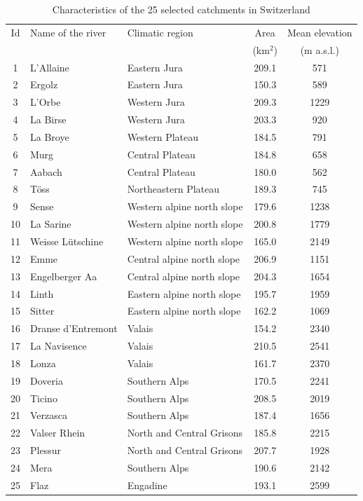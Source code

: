 \documentclass[draft]{agujournal2019}
\begin{document}
\begin{table}[hbt]
	\centering
	\caption{Characteristics of the 25 selected catchments in Switzerland}
	\small
	\begin{tabular}{cllcc}
		\hline 
		Id & Name of the river & Climatic region & Area & Mean elevation \\
		& & & (km$^2$) & (m a.s.l.) \\
		\hline 
		1 & L'Allaine & Eastern Jura & 209.1 & 571 \\
		2 & Ergolz & Eastern Jura & 150.3 & 589 \\
		3 & L'Orbe & Western Jura & 209.3 & 1229 \\
		4 & La Birse & Western Jura & 203.3 & 920 \\
		5 & La Broye & Western Plateau & 184.5 & 791 \\
		6 & Murg & Central Plateau & 184.8 & 658 \\
		7 & Aabach & Central Plateau & 180.0 & 562 \\
		8 & T\"oss & Northeastern Plateau & 189.3 & 745 \\
		9 & Sense & Western alpine north slope & 179.6 & 1238 \\
		10 & La Sarine & Western alpine north slope & 200.8 & 1779 \\
		11 & Weisse L\"utschine & Western alpine north slope & 165.0 & 2149 \\
		12 & Emme & Central alpine north slope & 206.9 & 1151 \\
		13 & Engelberger Aa & Central alpine north slope & 204.3 & 1654 \\
		14 & Linth & Eastern alpine north slope & 195.7 & 1959 \\
		15 & Sitter & Eastern alpine north slope & 162.2 & 1069 \\
		16 & Dranse d'Entremont & Valais & 154.2 & 2340 \\
		17 & La Navisence & Valais & 210.5 & 2541 \\
		18 & Lonza & Valais & 161.7 & 2370 \\
		19 & Doveria & Southern Alps & 170.5 & 2241 \\
		20 & Ticino & Southern Alps & 208.5 & 2019 \\
		21 & Verzasca & Southern Alps & 187.4 & 1656 \\
		22 & Valser Rhein & North and Central Grisons & 185.8 & 2215 \\
		23 & Plessur & North and Central Grisons & 207.7 & 1928 \\
		24 & Mera & Southern Alps & 190.6 & 2142 \\
		25 & Flaz & Engadine & 193.1 & 2599 \\
		\hline 
	\end{tabular} 
	\label{catchments}
\end{table}
\end{document}
